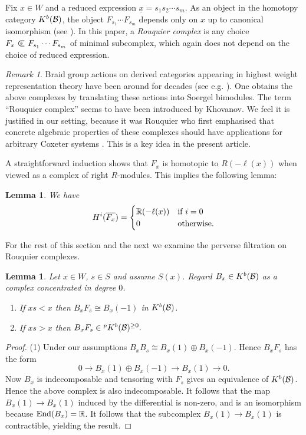\documentclass[11pt]{amsart}
\numberwithin{equation}{section}
\def\BS{{\EuScript B}}
\def\to{\rightarrow}
\def\summand{
\mathbin{\tikz [baseline=-3pt]
{
\clip (-0.2,-0.15) rectangle (0.2,0.15);
\node[scale=1.2] at (0,0) {$\subset$}; \node[scale=0.5] at
  (0,0) {$\oplus$}; }}
}
\DeclareMathOperator{\End}{End} %
\newtheorem{lem}[thm]{Lemma}
\theoremstyle{definition}
\theoremstyle{remark}
\newtheorem{remark}[thm]{Remark}
\begin{document}
{Fix $x \in W$ and a reduced expression $\underline{x} = s_1s_2 \cdots s_m$. As an object in the homotopy category $K^b({\mathcal{B}})$, the object $F_{s_1} \cdots F_{s_m}$ depends only on $x$ up to
canonical isomorphism (see \cite{Ro}). In this paper, a \emph{Rouquier complex} is any choice $F_x \summand F_{s_1} \cdots F_{s_m}$ of minimal subcomplex, which
again does not depend on the choice of reduced expression.

\begin{remark}
  Braid group actions on derived categories appearing in highest
  weight representation theory have 
  been around for decades (see e.g. \cite{Ca,Ri}). One obtains the
  above complexes by translating these actions into Soergel
  bimodules. The term ``Rouquier complex'' seems to have been
  introduced by Khovanov. We feel it is justified in our setting, because it was
  Rouquier who first emphasised that concrete algebraic properties of
  these complexes should have applications for arbitrary Coxeter
  systems \cite[4.2.1]{Ro2}. This is a key idea in the present article.
\end{remark}

A straightforward induction shows that $F_x$ is homotopic to
$R(-\ell(x))$ when viewed as a complex of right $R$-modules. This
implies the following lemma:

\begin{lem} \label{lem:Rouqcohom}
  We have
\[
H^i(\overline{F_x}) = \begin{cases} {\mathbb{R}}(-\ell(x)) & \text{if $i = 0$}
  \\ 0 & \text{otherwise}. \end{cases}
\]
\end{lem}

For the rest of this section and the next we examine the perverse
filtration on Rouquier complexes.

\begin{lem} \label{lem:fs} Let $x \in W$, $s \in S$ and assume
  $S(x)$. Regard $B_x \in K^b({\mathcal{B}})$ as a complex concentrated in degree $0$.
\begin{enumerate} \item If $xs < x$ then $B_xF_s \cong B_x(-1)$ in
  $K^b({\mathcal{B}})$.
\item If $xs > x$ then $B_xF_s \in {}^pK^b({\mathcal{B}})^{\ge 0}.$
\end{enumerate} \end{lem}

\begin{proof} (1) Under our assumptions $B_xB_s \cong B_x(1) \oplus B_x(-1)$. Hence $B_xF_s$ has the form \[ 0 \to B_x(1) \oplus B_x(-1) \to B_x(1) \to 0. \] Now $B_x$ is indecomposable
and tensoring with $F_s$ gives an equivalence of $K^b({\mathcal{B}})$. Hence the above complex is also indecomposable. It follows that the map $B_x(1) \to B_x(1)$ induced by the differential is
non-zero, and is an isomorphism because $\End(B_x)=\RM$. It follows that the subcomplex $B_x(1) \to B_x(1)$ is contractible, yielding the result.


\end{proof}}
\end{document}
